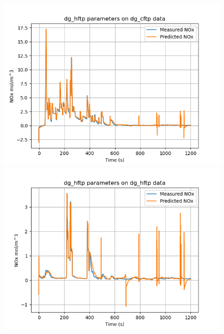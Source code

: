 \begin{figure}[H]
        \begin{minipage}{0.3\textwidth}
                \includegraphics[width = \textwidth]{./figs/figs_new_mdl/dg_hftp_dg_cftp.png}
        \end{minipage}
        \begin{minipage}{0.3\textwidth}
                \includegraphics[width = \textwidth]{./figs/figs_new_mdl/dg_hftp_dg_hftp.png}
        \end{minipage}
        \begin{minipage}{0.3\textwidth}

\end{minipage}
\end{figure}
